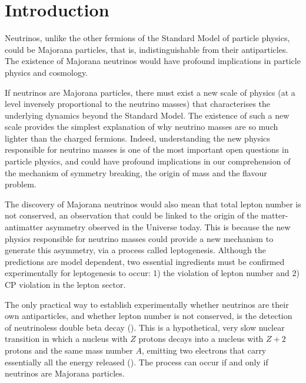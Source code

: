 \section{Introduction}
Neutrinos, unlike the other fermions of the Standard Model of particle physics, could be Majorana particles, that is, indistinguishable from their antiparticles. The existence of Majorana neutrinos would have profound implications in particle physics and cosmology. 

 If neutrinos are Majorana particles, there must exist a new scale of physics (at a level inversely proportional to the neutrino masses) that characterises the underlying dynamics beyond the Standard Model. The existence of such a new scale provides the simplest explanation of why neutrino masses are so much lighter than the charged fermions. Indeed, understanding the new physics responsible for neutrino masses is one of the most important open questions in particle physics, and could have profound implications in our comprehension of the mechanism of symmetry breaking, the origin of mass and the flavour problem. 

The discovery of Majorana neutrinos would also mean that total lepton number is not conserved, an observation that could be linked to the origin of the matter-antimatter asymmetry observed in the Universe today. This is because the new physics responsible for neutrino masses could provide a new mechanism to generate this asymmetry, via a process called leptogenesis. Although the predictions are model dependent, two essential ingredients must be confirmed experimentally for leptogenesis to occur: 1) the violation of lepton number and 2) CP violation in the lepton sector. 

The only practical way to establish experimentally whether neutrinos are their own antiparticles, and whether lepton number is not conserved, is the detection of neutrinoless double beta decay (\bbonu). This is a hypothetical, very slow nuclear transition in which a nucleus with $Z$ protons decays into a nucleus with $Z+2$ protons and the same mass number $A$, emitting two electrons that carry essentially all the energy released (\Qbb). The process can occur if and only if neutrinos are Majorana particles. 

